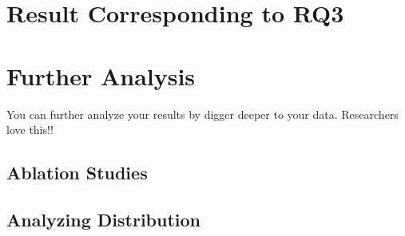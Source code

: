\section{Result Corresponding to RQ3}

\section{Further Analysis}
You can further analyze your results by digger deeper to your data.  Researchers love this!!
\subsection{Ablation Studies}
\subsection{Analyzing Distribution}
